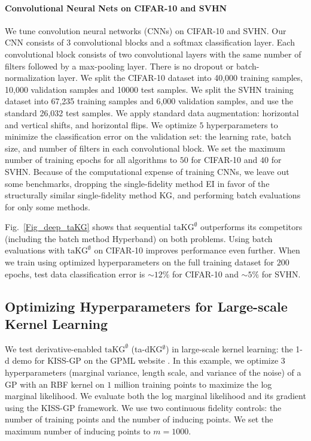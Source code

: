 \documentclass[letterpaper]{article}
\newcommand{\taKGE}{\text{taKG}^\emptyset}
\numberwithin{equation}{section}
\begin{document}
\paragraph{Convolutional Neural Nets on CIFAR-10 and SVHN}
\label{sect:cnns}
We tune convolution neural networks (CNNs) on CIFAR-10 and SVHN. Our CNN consists of 3 convolutional blocks and a softmax classification layer. Each convolutional block consists of two convolutional layers with the same number of filters followed by a max-pooling layer. There is no dropout or batch-normalization layer. We split the CIFAR-10 dataset into 40,000 training samples, 10,000 validation samples and 10000 test samples. We split the SVHN training dataset into 67,235 training samples and 6,000 validation samples, and use the standard 26,032 test samples. We apply standard data augmentation: horizontal and vertical shifts, and horizontal flips. We optimize $5$ hyperparameters to minimize the classification error on the validation set: the learning rate, batch size, and number of filters in each convolutional block. 
We set the maximum number of training epochs for all algorithms to $50$ for CIFAR-10 and $40$ for SVHN. 
Because of the computational expense of training CNNs, we leave out some benchmarks, dropping the single-fidelity method EI in favor of the structurally similar single-fidelity method KG, and performing batch evaluations for only some methods.

Fig.~\ref{Fig_deep_taKG} shows that sequential $\taKGE$ outperforms its competitors (including the batch method Hyperband) on both problems.  Using batch evaluations with $\taKGE$ on CIFAR-10 improves performance even further.
When we train using optimized hyperparameters on the full training dataset for $200$ epochs, test data classification error is $\sim12\%$ for CIFAR-10 and $\sim5\%$ for SVHN. 


\subsection{Optimizing Hyperparameters for Large-scale Kernel Learning}
\label{sect:kernel-learning}
We test derivative-enabled $\taKGE$ (ta-dKG$^\emptyset$) in large-scale kernel learning: the 1-d demo for KISS-GP \citep{wilson2015kernel} on the GPML website \citep{gpml}.  In this example, we optimize 3 hyperparameters (marginal variance, length scale, and variance of the noise) of a GP with an RBF kernel on $1$ million training points to maximize the log marginal likelihood. We evaluate both the log marginal likelihood and its gradient using the KISS-GP framework. We use two continuous fidelity controls: the number of training points and the number of inducing points.  We set the maximum number of inducing points to $m=1000$.
\end{document}
